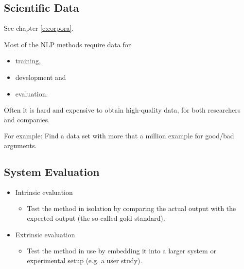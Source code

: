 \documentclass[a4paper, 11pt, accentcolor = tud3b]{tudreport}
\begin{document}
            \subsection{Scientific Data} %
            	See chapter \ref{c:corpora}.
            
                Most of the NLP methods require data for
                \begin{itemize}
                	\item training,
                	\item development and
                	\item evaluation.
                \end{itemize}
            	Often it is hard and expensive to obtain high-quality data, for both researchers and companies.
            	
            	For example: Find a data set with more that a million example for good/bad arguments.

            \subsection{System Evaluation} %
                \begin{itemize}
                	\item Intrinsic evaluation
                		\begin{itemize}
                			\item Test the method in isolation by comparing the actual output with the expected output (the so-called gold standard).
                		\end{itemize}
                	\item Extrinsic evaluation
                		\begin{itemize}
                			\item Test the method in use by embedding it into a larger system or experimental setup (e.g. a user study).
                		\end{itemize}
                \end{itemize}
\end{document}
